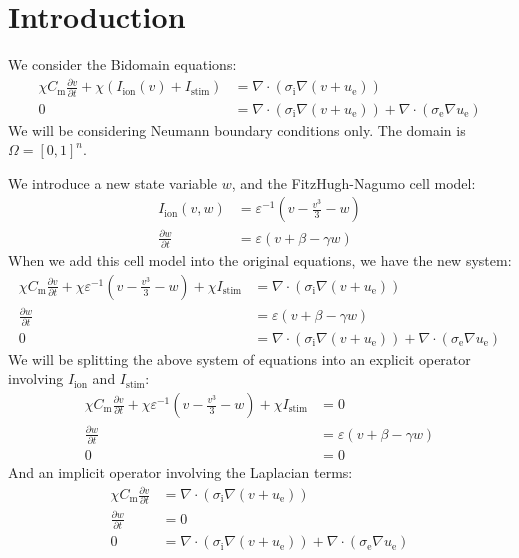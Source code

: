 \documentclass{article}
\begin{document}
\section{Introduction}

We consider the Bidomain equations:
\begin{align*}
    \chi C_\text{m} \frac{\partial v}{\partial t}
            + \chi (I_\text{ion}(v) + I_\text{stim})
        & = \nabla \cdot (\sigma_\text{i} \nabla (v + u_\text{e})) \\
    0
        & = \nabla \cdot (\sigma_\text{i} \nabla (v + u_\text{e}))
            + \nabla \cdot (\sigma_\text{e} \nabla u_\text{e})
\end{align*}
\noindent We will be considering Neumann boundary conditions only.
The domain is $\Omega = [0, 1]^n$.

We introduce a new state variable $w$,
and the FitzHugh-Nagumo cell model:
\begin{align*}
    I_\text{ion}(v, w)
        & = \varepsilon^{-1} (v - \frac{v^3}{3} - w) \\
    \frac{\partial w}{\partial t}
        & = \varepsilon (v + \beta - \gamma w)
\end{align*}
\noindent When we add this cell model into the original equations,
we have the new system:
\begin{align*}
    \chi C_\text{m} \frac{\partial v}{\partial t}
            + \chi \varepsilon^{-1} (v - \frac{v^3}{3} - w)
            + \chi I_\text{stim}
        & = \nabla \cdot (\sigma_\text{i} \nabla (v + u_\text{e})) \\
    \frac{\partial w}{\partial t}
        & = \varepsilon (v + \beta - \gamma w) \\
    0
        & = \nabla \cdot (\sigma_\text{i} \nabla (v + u_\text{e}))
            + \nabla \cdot (\sigma_\text{e} \nabla u_\text{e})
\end{align*}
\noindent We will be splitting the above system of equations into an explicit operator
involving $I_\text{ion}$ and $I_\text{stim}$:
\begin{align*}
    \chi C_\text{m} \frac{\partial v}{\partial t}
            + \chi \varepsilon^{-1} (v - \frac{v^3}{3} - w)
            + \chi I_\text{stim}
        & = 0 \\
    \frac{\partial w}{\partial t}
        & = \varepsilon (v + \beta - \gamma w) \\
    0 & = 0
\end{align*}
\noindent And an implicit operator involving the Laplacian terms:
\begin{align*}
    \chi C_\text{m} \frac{\partial v}{\partial t}
        & = \nabla \cdot (\sigma_\text{i} \nabla (v + u_\text{e})) \\
    \frac{\partial w}{\partial t} & = 0 \\
    0
        & = \nabla \cdot (\sigma_\text{i} \nabla (v + u_\text{e}))
            + \nabla \cdot (\sigma_\text{e} \nabla u_\text{e})
\end{align*}
\end{document}
